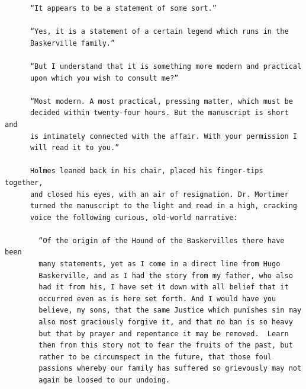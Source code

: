 \documentclass{article}
\begin{document}
\begin{verbatim}
      “It appears to be a statement of some sort.”

      “Yes, it is a statement of a certain legend which runs in the
      Baskerville family.”

      “But I understand that it is something more modern and practical
      upon which you wish to consult me?”

      “Most modern. A most practical, pressing matter, which must be
      decided within twenty-four hours. But the manuscript is short and
      is intimately connected with the affair. With your permission I
      will read it to you.”

      Holmes leaned back in his chair, placed his finger-tips together,
      and closed his eyes, with an air of resignation. Dr. Mortimer
      turned the manuscript to the light and read in a high, cracking
      voice the following curious, old-world narrative:

        “Of the origin of the Hound of the Baskervilles there have been
        many statements, yet as I come in a direct line from Hugo
        Baskerville, and as I had the story from my father, who also
        had it from his, I have set it down with all belief that it
        occurred even as is here set forth. And I would have you
        believe, my sons, that the same Justice which punishes sin may
        also most graciously forgive it, and that no ban is so heavy
        but that by prayer and repentance it may be removed.  Learn
        then from this story not to fear the fruits of the past, but
        rather to be circumspect in the future, that those foul
        passions whereby our family has suffered so grievously may not
        again be loosed to our undoing.


\end{verbatim}
\end{document}
